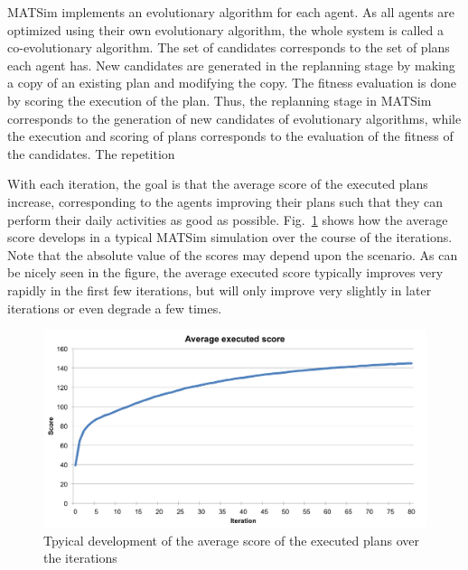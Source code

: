 MATSim implements an evolutionary algorithm for each agent. As all agents are
optimized using their own evolutionary algorithm, the whole system is called a
co-evolutionary algorithm. The set of candidates corresponds to the set of plans
each agent has. New candidates are generated in the replanning stage by making a
copy of an existing plan and modifying the copy. The fitness evaluation is done
by scoring the execution of the plan.
Thus, the replanning stage in MATSim corresponds to the generation of new
candidates of evolutionary algorithms, while the execution and scoring of plans
corresponds to the evaluation of the fitness of the candidates. The repetition 

With each iteration, the goal is that the average score of the executed plans
increase, corresponding to the agents improving their plans such that they can
perform their daily activities as good as possible.
Fig.~\ref{fig:overview:scores} shows how the average score develops in a typical
MATSim simulation over the course of the iterations. Note that the absolute
value of the scores may depend upon the scenario. As can be nicely seen in the
figure, the average executed score typically improves very rapidly in the first
few iterations, but will only improve very slightly in later iterations or even
degrade a few times.


\begin{figure}[htp]
\begin{center}
  \includegraphics[width=.9\textwidth]{figures/overview/scorestats.png}
  \caption{Tpyical development of the average score of the executed plans over
  the iterations}
  \label{fig:overview:scores}
\end{center}
\end{figure}


